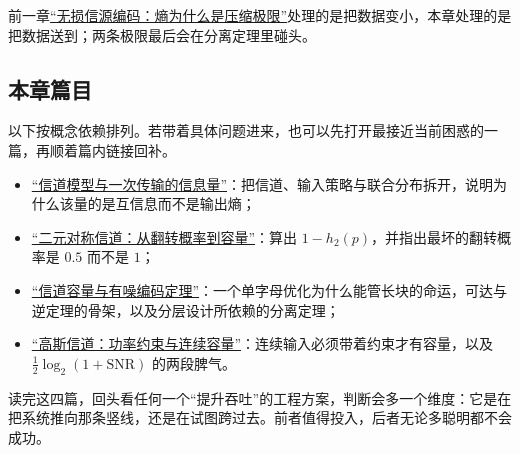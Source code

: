 前一章\hyperref[ch:057]{``无损信源编码：熵为什么是压缩极限''}处理的是把数据变小，本章处理的是把数据送到；两条极限最后会在分离定理里碰头。

\subsection{本章篇目}

以下按概念依赖排列。若带着具体问题进来，也可以先打开最接近当前困惑的一篇，再顺着篇内链接回补。

\begin{itemize}
\tightlist
\item \hyperref[sec:07-Information-Theory/05-Channel-Coding/01]{``信道模型与一次传输的信息量''}：把信道、输入策略与联合分布拆开，说明为什么该量的是互信息而不是输出熵；
\item \hyperref[sec:07-Information-Theory/05-Channel-Coding/02]{``二元对称信道：从翻转概率到容量''}：算出 \(1-h_2(p)\)，并指出最坏的翻转概率是 \(0.5\) 而不是 \(1\)；
\item \hyperref[sec:07-Information-Theory/05-Channel-Coding/03]{``信道容量与有噪编码定理''}：一个单字母优化为什么能管长块的命运，可达与逆定理的骨架，以及分层设计所依赖的分离定理；
\item \hyperref[sec:07-Information-Theory/05-Channel-Coding/04]{``高斯信道：功率约束与连续容量''}：连续输入必须带着约束才有容量，以及 \(\frac12\log_2(1+\mathrm{SNR})\) 的两段脾气。
\end{itemize}

读完这四篇，回头看任何一个``提升吞吐''的工程方案，判断会多一个维度：它是在把系统推向那条竖线，还是在试图跨过去。前者值得投入，后者无论多聪明都不会成功。

